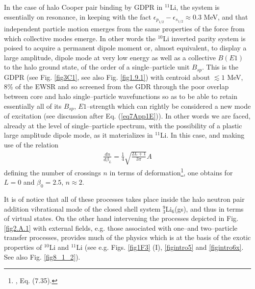 \begin{subappendices}
In the case of halo Cooper pair binding by GDPR in $^{11}$Li, the system is essentially on resonance, in keeping with the fact $\epsilon_{p_{1/2}}-\epsilon_{s_{1/2}}\approx 0.3$ MeV, and that independent particle motion emerges from the same properties of the force from which collective modes emerge. In other words the $^{10}$Li inverted parity system is poised to acquire a permanent dipole moment or, almost equivalent, to display a large amplitude, dipole mode at very low energy as well as a collective $B(E1)$ to the halo ground state, of the order of a single--particle unit $B_{sp}$. This is the GDPR (see Fig. \ref{fig3C1}, see also Fig. \ref{fig1.9.1}) with centroid about $\lesssim 1$ MeV, 8\% of the EWSR and so screened from the GDR through the poor overlap between core and halo single--particle wavefunctions so as to be able to retain essentially all of its $B_{sp}$, $E1$--strength which can rightly be considered a new mode of excitation (see discussion after Eq. (\ref{eq7App1E})). In other words we are faced, already at the level of single--particle spectrum, with the possibility of a plastic large amplitude dipole mode, as it materializes in $^{11}$Li. In this case, and making use of the relation 
\begin{align}\label{eq3C6}
\frac{dn}{d\beta_L}=\frac{1}{4}\sqrt{\frac{2L+1}{3\pi}}A
\end{align}  
defining the number of crossings $n$ in terms of deformation\footnote{\cite{Brink:05}, Eq. (7.35).}, one obtains for $L=0$ and $\beta_0=2.5$, $n\approx 2$.

 
It is of notice that all of these processes takes place inside the halo neutron pair addition vibrational mode of the closed shell system $^9_3$Li$_6$(gs), and thus in terms of virtual states. On the other hand intervening the processes depicted in Fig. \ref{fig2.A.1} with external fields, e.g. those associated with one--and two--particle transfer processes, provides much of the physics which is at the basis of the exotic properties of $^{10}$Li and $^{11}$Li (see e.g. Figs. \ref{fig1F3} (I), \ref{figintro5} and \ref{figintro6x}. See also Fig. \ref{fig8_1_2}). 



\end{subappendices}
